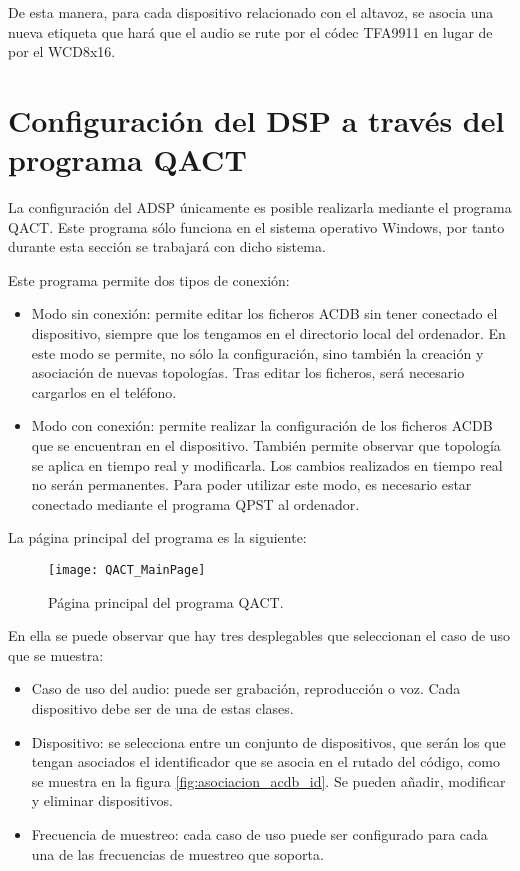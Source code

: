 De esta manera, para cada dispositivo relacionado con el altavoz, se asocia una nueva etiqueta que hará que el audio se rute por el códec TFA9911 en lugar de por el WCD8x16.

\section{Configuración del DSP a través del programa QACT} \label{sec:conf_DSP}
La configuración del \gls{ADSP} únicamente es posible realizarla mediante el programa \gls{QACT}. Este programa sólo funciona en el sistema operativo Windows, por tanto durante esta sección se trabajará con dicho sistema.

Este programa permite dos tipos de conexión:
\begin{itemize}
	\item{Modo sin conexión: permite editar los ficheros \gls{ACDB} sin tener conectado el dispositivo, siempre que los tengamos en el directorio local del ordenador. En este modo se permite, no sólo la configuración, sino también la creación y asociación de nuevas topologías. Tras editar los ficheros, será necesario cargarlos en el teléfono.}
	\item{Modo con conexión: permite realizar la configuración de los ficheros \gls{ACDB} que se encuentran en el dispositivo. También permite observar que topología se aplica en tiempo real y modificarla. Los cambios realizados en tiempo real no serán permanentes. Para poder utilizar este modo, es necesario estar conectado mediante el programa \gls{QPST} al ordenador.}
\end{itemize}

La página principal del programa es la siguiente:

\begin{figure}[H]
	\centering
	\texttt{[image: QACT\_MainPage]}
	\caption{Página principal del programa QACT.} 
	\label{fig:qact_main}
\end{figure}

En ella se puede observar que hay tres desplegables que seleccionan el caso de uso que se muestra:
\begin{itemize}
	\item{Caso de uso del audio: puede ser grabación, reproducción o voz. Cada dispositivo debe ser de una de estas clases.}
	\item{Dispositivo: se selecciona entre un conjunto de dispositivos, que serán los que tengan asociados el identificador que se asocia en el rutado del código, como se muestra en la figura \ref{fig:asociacion_acdb_id}. Se pueden añadir, modificar y eliminar dispositivos.}
	\item{Frecuencia de muestreo: cada caso de uso puede ser configurado para cada una de las frecuencias de muestreo que soporta.}
\end{itemize}


